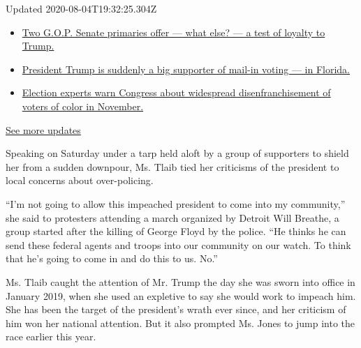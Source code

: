 Updated 2020-08-04T19:32:25.304Z

\begin{itemize}
\tightlist
\item
  \href{https://www.nytimes3xbfgragh.onion/2020/08/04/us/elections/primary-election-michigan-arizona-kansas.html?action=click\&pgtype=Article\&state=default\&region=MAIN_CONTENT_1\&context=storylines_live_updates\#link-3924dd44}{Two
  G.O.P. Senate primaries offer --- what else? --- a test of loyalty to
  Trump.}
\item
  \href{https://www.nytimes3xbfgragh.onion/2020/08/04/us/elections/primary-election-michigan-arizona-kansas.html?action=click\&pgtype=Article\&state=default\&region=MAIN_CONTENT_1\&context=storylines_live_updates\#link-32b39e33}{President
  Trump is suddenly a big supporter of mail-in voting --- in Florida.}
\item
  \href{https://www.nytimes3xbfgragh.onion/2020/08/04/us/elections/primary-election-michigan-arizona-kansas.html?action=click\&pgtype=Article\&state=default\&region=MAIN_CONTENT_1\&context=storylines_live_updates\#link-6d019753}{Election
  experts warn Congress about widespread disenfranchisement of voters of
  color in November.}
\end{itemize}

\href{https://www.nytimes3xbfgragh.onion/2020/08/04/us/elections/primary-election-michigan-arizona-kansas.html?action=click\&pgtype=Article\&state=default\&region=MAIN_CONTENT_1\&context=storylines_live_updates}{See
more updates}

Speaking on Saturday under a tarp held aloft by a group of supporters to
shield her from a sudden downpour, Ms. Tlaib tied her criticisms of the
president to local concerns about over-policing.

``I'm not going to allow this impeached president to come into my
community,'' she said to protesters attending a march organized by
Detroit Will Breathe, a group started after the killing of George Floyd
by the police. ``He thinks he can send these federal agents and troops
into our community on our watch. To think that he's going to come in and
do this to us. No.''

Ms. Tlaib caught the attention of Mr. Trump the day she was sworn into
office in January 2019, when she used an expletive to say she would work
to impeach him. She has been the target of the president's wrath ever
since, and her criticism of him won her national attention. But it also
prompted Ms. Jones to jump into the race earlier this year.

